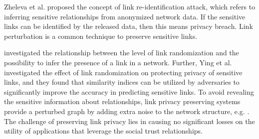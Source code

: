 Zheleva et al. \cite{zheleva2008preserving} proposed the concept of link re-identification attack, which refers to inferring sensitive relationships from anonymized network data. If the sensitive links can be identified by the released data, then this means privacy breach. Link perturbation is a common technique to preserve sensitive links. 

\cite{zheleva2008preserving,ying2008randomizing} investigated the relationship between the level of link randomization and the possibility to infer the presence of a link in a network. Further, Ying et al. \cite{ying2009link} investigated the effect of link randomization on protecting privacy of sensitive links, and they found that similarity indices can be utilized by adversaries to significantly improve the accuracy in predicting sensitive links.
To avoid revealing the sensitive information about relationships, link privacy preserving systems provide a perturbed graph by adding extra noise to the network structure, e.g. \cite{hay2008resisting,mittalNDSS13,ying2008randomizing,zheleva2008preserving}. The challenge of preserving link privacy lies in causing no significant losses on the utility of applications that leverage the social trust relationships.




